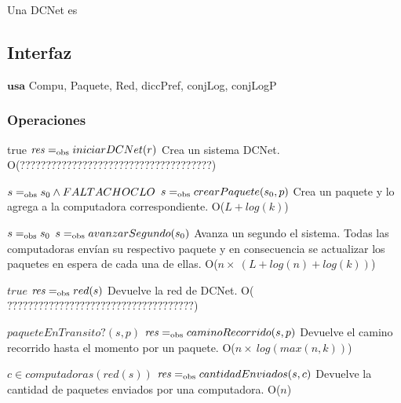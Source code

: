 

Una DCNet es

\subsection{Interfaz}

$\textbf{usa}$  
Compu, Paquete, Red, diccPref, conjLog, conjLogP


\subsubsection*{Operaciones}


 {true}
 {$\text{\textit{res}} =_{\mathrm{obs}} iniciarDCNet(r)$}
 {Crea un sistema DCNet.}
 {O(?????????????????????????????????????)}

 {$s =_{\mathrm{obs}} s_0 \land FALTA CHOCLO$}
 {$s =_{\mathrm{obs}} crearPaquete(s_0, p)$}
 {Crea un paquete y lo agrega a la computadora correspondiente.}
 {O($L + log(k)$)}

 {$s =_{\mathrm{obs}} s_0$}
 {$s =_{\mathrm{obs}} avanzarSegundo(s_0)$}
 {Avanza un segundo el sistema. Todas las computadoras envían su respectivo paquete y en consecuencia se actualizar los paquetes en espera de cada una de ellas.}
 {O($n \times\ (L + log(n) + log(k))$)}

 {$true$}
 {$\text{\textit{res}} =_{\mathrm{obs}} red(s)$}
 {Devuelve la red de DCNet.}
 {O($????????????????????????????????????$)}

 {$paqueteEnTransito?(s,p)$}
 {$\text{\textit{res}} =_{\mathrm{obs}} caminoRecorrido(s,p)$}
 {Devuelve el camino recorrido hasta el momento por un paquete.}
 {O($n \times\  log(max(n,k))$)}

 {$c \in computadoras(red(s))$}
 {$\text{\textit{res}} =_{\mathrm{obs}} cantidadEnviados(s,c)$}
 {Devuelve la cantidad de paquetes enviados por una computadora.}
 {O($n$)} %

